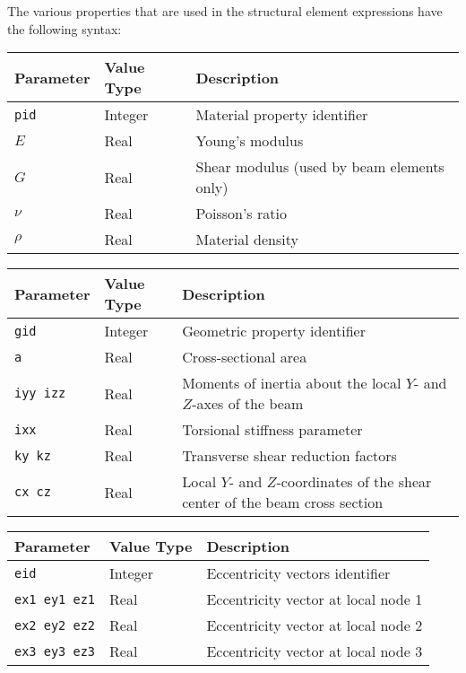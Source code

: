 
The various properties that are used in the structural element expressions
have the following syntax:


\noindent
\begin{tabular}{| m{} | m{} | m{} |}
  \hline
  \rowcolor[HTML]{EFEFEF}
  Parameter & Value Type & Description \\
  \hline\hline
  {\tt pid} & Integer & Material property identifier \\
  \hline
  {\tt $E$} & Real & Young’s modulus \\
  \hline
  {\tt $G$} & Real & Shear modulus (used by beam elements only) \\
  \hline
  $\nu$     & Real & Poisson’s ratio \\
  \hline
  $\rho$    & Real & Material density \\
  \hline
\end{tabular}


\noindent
\begin{tabular}{| m{} | m{} | m{} |}
  \hline
  \rowcolor[HTML]{EFEFEF}
  Parameter & Value Type & Description  \\
  \hline\hline
  {\tt gid} & Integer & Geometric property identifier \\
  \hline
  {\tt a}   & Real & Cross-sectional area \\
  \hline
  {\tt iyy izz} & Real & Moments of inertia about the local
                        $Y$- and $Z$-axes of the beam \\
  \hline
  {\tt ixx}   & Real & Torsional stiffness parameter \\
  \hline
  {\tt ky kz} & Real & Transverse shear reduction factors \\
  \hline
  {\tt cx cz} & Real & Local $Y$- and $Z$-coordinates of the shear center
                of the beam cross section \\
  \hline
\end{tabular}


\noindent
\begin{tabular}{| m{} | m{} | m{} |}
  \hline
  \rowcolor[HTML]{EFEFEF}
  Parameter   & Value Type & Description  \\
  \hline\hline
  {\tt eid}      & Integer & Eccentricity vectors identifier \\
  \hline
  {\tt ex1 ey1 ez1} & Real & Eccentricity vector at local node 1 \\
  \hline
  {\tt ex2 ey2 ez2} & Real & Eccentricity vector at local node 2 \\
  \hline
  {\tt ex3 ey3 ez3} & Real & Eccentricity vector at local node 3 \\
  \hline
\end{tabular}

